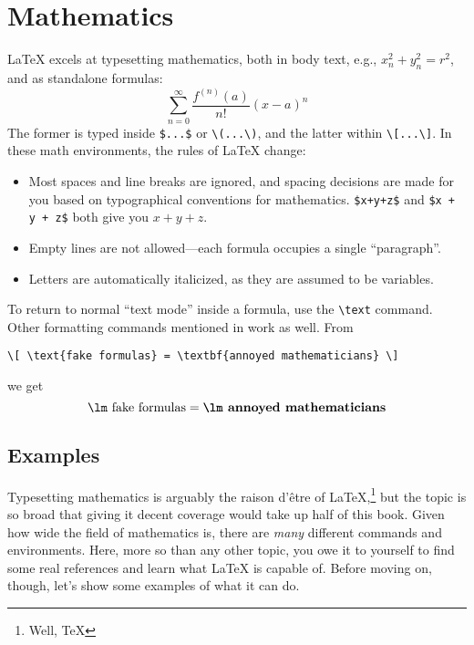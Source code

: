 \chapter{Mathematics}
\label{math}

\LaTeX{} excels at typesetting mathematics, both in body text,
e.g., $x_n^2+y_n^2=r^2$, and as standalone formulas:
\[\sum_{n=0}^{\infty} \frac{f^{(n)} (a)}{n!} (x - a)^n\]
The former is typed inside \verb|$...$| or \verb|\(...\)|,
and the latter within \verb|\[...\]|.
In these math environments, the rules of \LaTeX{} change:
\begin{itemize}
\item Most spaces and line breaks are ignored,
    and spacing decisions are made for you based on
    typographical conventions for mathematics.
    \verb|$x+y+z$| and \verb|$x + y + z$| both give you $x+y+z$.
\item Empty lines are not allowed---each formula occupies a single
    ``paragraph''\quotekern.
\item Letters are automatically italicized, as they are assumed to be variables.
\end{itemize}
To return to normal ``text mode'' inside a formula, use the \verb|\text| command.
Other formatting commands mentioned in  work as well.
From
\begin{leftfigure}
\begin{lstlisting}
\[ \text{fake formulas} = \textbf{annoyed mathematicians} \]
\end{lstlisting}
\end{leftfigure}
we get
\[ \text{\lm fake formulas} = \textbf{\lm annoyed mathematicians} \]

\section{Examples}

Typesetting mathematics is arguably the raison d'être of
\LaTeX,\punckern\footnote{Well, \TeX} but the topic is so broad that giving
it decent coverage would take up half of this book.
Given how wide the field of mathematics is,
there are \emph{many} different commands and environments.
Here, more so than any other topic,
you owe it to yourself to find some real references and learn what \LaTeX{}
is capable of.
Before moving on, though, let's show some examples of what it can do.
\newpage


